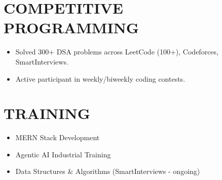 \documentclass[letterpaper,11pt]{article}
\begin{document}
\section*{COMPETITIVE PROGRAMMING}

\begin{itemize}
\item Solved 300+ DSA problems across LeetCode (100+), Codeforces, SmartInterviews.
\item Active participant in weekly/biweekly coding contests.

\end{itemize}

\section*{TRAINING}

\begin{itemize}
\item MERN Stack Development
\item Agentic AI Industrial Training
\item Data Structures \& Algorithms (SmartInterviews - ongoing)
\end{itemize}
\end{document}
